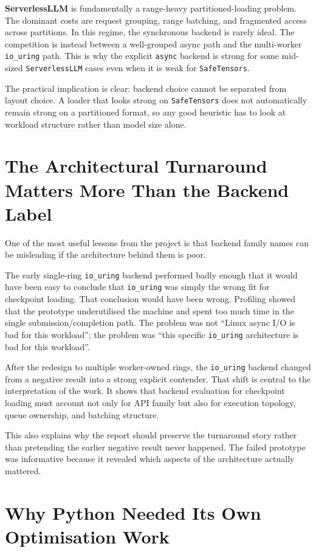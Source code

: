 \textbf{ServerlessLLM} is fundamentally a range-heavy partitioned-loading problem. The dominant costs are request grouping, range batching, and fragmented access across partitions. In this regime, the synchronous backend is rarely ideal. The competition is instead between a well-grouped async path and the multi-worker \texttt{io\_uring} path. This is why the explicit \texttt{async} backend is strong for some mid-sized \texttt{ServerlessLLM} cases even when it is weak for \texttt{SafeTensors}.

The practical implication is clear: backend choice cannot be separated from layout choice. A loader that looks strong on \texttt{SafeTensors} does not automatically remain strong on a partitioned format, so any good heuristic has to look at workload structure rather than model size alone.

\section{The Architectural Turnaround Matters More Than the Backend Label}

One of the most useful lessons from the project is that backend family names can be misleading if the architecture behind them is poor.

The early single-ring \texttt{io\_uring} backend performed badly enough that it would have been easy to conclude that \texttt{io\_uring} was simply the wrong fit for checkpoint loading. That conclusion would have been wrong. Profiling showed that the prototype underutilised the machine and spent too much time in the single submission/completion path. The problem was not ``Linux async I/O is bad for this workload''; the problem was ``this specific \texttt{io\_uring} architecture is bad for this workload''.

After the redesign to multiple worker-owned rings, the \texttt{io\_uring} backend changed from a negative result into a strong explicit contender. That shift is central to the interpretation of the work. It shows that backend evaluation for checkpoint loading must account not only for API family but also for execution topology, queue ownership, and batching structure.

This also explains why the report should preserve the turnaround story rather than pretending the earlier negative result never happened. The failed prototype was informative because it revealed which aspects of the architecture actually mattered.

\section{Why Python Needed Its Own Optimisation Work}

